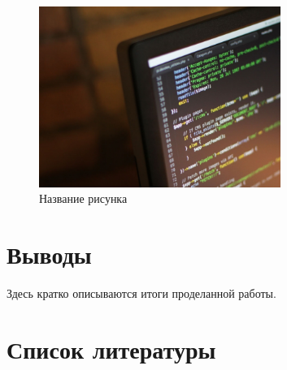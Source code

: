\documentclass[
  12pt,
  russian,
  a4paper,
]{scrreprt}
\begin{document}
\begin{figure}
\hypertarget{fig:001}{%
\centering
\includegraphics[width=0.7\textwidth,height=\textheight]{tex2pdf.-a0d3bc333fd33c29/ee62f68625d09ecdc466e7deaa763b4f88300352.jpg}
\caption{Название рисунка}\label{fig:001}
}
\end{figure}

\hypertarget{ux432ux44bux432ux43eux434ux44b}{%
\chapter{Выводы}\label{ux432ux44bux432ux43eux434ux44b}}

Здесь кратко описываются итоги проделанной работы.

\hypertarget{ux441ux43fux438ux441ux43eux43a-ux43bux438ux442ux435ux440ux430ux442ux443ux440ux44b}{%
\chapter*{Список
литературы}\label{ux441ux43fux438ux441ux43eux43a-ux43bux438ux442ux435ux440ux430ux442ux443ux440ux44b}}
\end{document}

